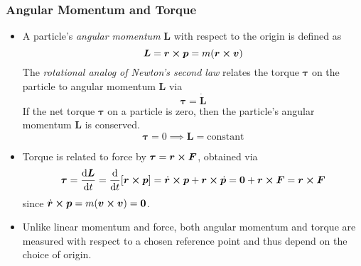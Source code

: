 \documentclass[11pt, a4paper]{article}
\newcommand{\bdot}[1]{\dot{\bm{#1}}}
\begin{document}
\subsubsection{Angular Momentum and Torque}
\begin{itemize}
	\item A particle's \textit{angular momentum} $ \bm{L} $ with respect to the origin is defined as
	\begin{equation*}
		\bm{L} = \bm{r} \cross \bm{p} = m (\bm{r} \cross \bm{v})
	\end{equation*}
	The \textit{rotational analog of Newton's second law} relates the torque $ \bm{\tau} $ on the particle to angular momentum $ \bm{L} $ via
	\begin{equation*}
		\bm{\tau} = \bdot{L}
	\end{equation*}
	If the net torque $ \bm{\tau} $ on a particle is zero, then the particle's angular momentum $ \bm{L} $ is conserved. 
	\begin{equation*}
		 \bm{\tau} = 0 \implies \bm{L} = \text{constant} 
	\end{equation*}
	
	\item Torque is related to force by $ \bm{\tau} = \bm{r} \cross \bm{F} $, obtained via
	\begin{align*}
		\bm{\tau} = \dv{\bm{L}}{t} = \dv{}{t}[\bm{r} \cross \bm{p}] = \dot{\bm{r}} \cross \bm{p} + \bm{r} \cross \dot{\bm{p}} = \bm{0} + \bm{r} \cross \bm{F} =  \bm{r} \cross \bm{F}
	\end{align*}
	since $ \dot{\bm{r}} \cross \bm{p} = m (\bm{v} \cross \bm{v}) = \bm{0} $.
	
	\item Unlike linear momentum and force, both angular momentum and torque are measured with respect to a chosen reference point and thus depend on the choice of origin.
	
\end{itemize}
\end{document}
